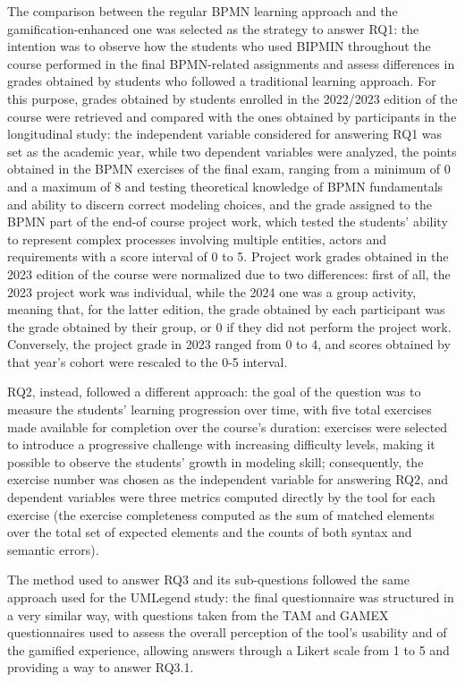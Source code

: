 The comparison between the regular BPMN learning approach and the gamification-enhanced one was selected as the strategy to answer RQ1: the intention was to observe how the students who used BIPMIN throughout the course performed in the final BPMN-related assignments and assess differences in grades obtained by students who followed a traditional learning approach. For this purpose, grades obtained by students enrolled in the 2022/2023 edition of the course were retrieved and compared with the ones obtained by participants in the longitudinal study: the independent variable considered for answering RQ1 was set as the academic year, while two dependent variables were analyzed, the points obtained in the BPMN exercises of the final exam, ranging from a minimum of 0 and a maximum of 8 and testing theoretical knowledge of BPMN fundamentals and ability to discern correct modeling choices, and the grade assigned to the BPMN part of the end-of course project work, which tested the students' ability to represent complex processes involving multiple entities, actors and requirements with a score interval of 0 to 5. Project work grades obtained in the 2023 edition of the course were normalized due to two differences: first of all, the 2023 project work was individual, while the 2024 one was a group activity, meaning that, for the latter edition, the grade obtained by each participant was the grade obtained by their group, or 0 if they did not perform the project work. Conversely, the project grade in 2023 ranged from 0 to 4, and scores obtained by that year's cohort were rescaled to the 0-5 interval.

RQ2, instead, followed a different approach: the goal of the question was to measure the students' learning progression over time, with five total exercises made available for completion over the course's duration: exercises were selected to introduce a progressive challenge with increasing difficulty levels, making it possible to observe the students' growth in modeling skill; consequently, the exercise number was chosen as the independent variable for answering RQ2, and dependent variables were three metrics computed directly by the tool for each exercise (the exercise completeness computed as the sum of matched elements over the total set of expected elements and the counts of both syntax and semantic errors).   

The method used to answer RQ3 and its sub-questions followed the same approach used for the UMLegend study: the final questionnaire was structured in a very similar way, with questions taken from the TAM \cite{davis1989perceived, lee2003technology} and GAMEX \cite{eppmann2018gameful} questionnaires used to assess the overall perception of the tool's usability and of the gamified experience, allowing answers through a Likert scale from 1 to 5 and providing a way to answer RQ3.1.


